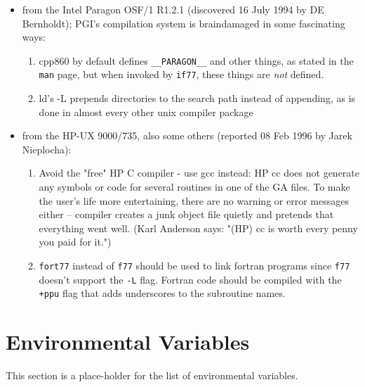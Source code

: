 \begin{itemize}
\item from the Intel Paragon OSF/1 R1.2.1 (discovered 16 July 1994 by DE Bernholdt);
PGI's compilation system is braindamaged in some fascinating ways:
\begin{enumerate}
\item cpp860 by default defines {\tt \_\_PARAGON\_\_} and other things, as stated in
   the {\tt man} page, but when invoked by {\tt if77}, these things are {\em not} defined.
\item ld's -L prepends directories to the search path instead of
   appending, as is done in almost every other unix compiler package
\end{enumerate}

\item from the HP-UX 9000/735, also some others (reported 08 Feb 1996 by Jarek Nieplocha):

\begin{enumerate}
\item Avoid the "free" HP C compiler - use gcc instead:
HP cc does not generate any symbols or code for several routines in one of
the GA files. To make the user's life more entertaining, there are no 
warning or error messages either -- compiler creates a junk object file
quietly and pretends that everything went well.
(Karl Anderson says: "(HP) cc is worth every penny you paid for it.")

\item {\tt fort77} instead of {\tt f77} should be used to link fortran programs since 
{\tt f77} doesn't support the {\tt -L} flag. Fortran code should be compiled with the 
{\tt +ppu} flag that adds underscores to the subroutine names.
\end{enumerate}

\end{itemize}

\section{Environmental Variables}
\label{sec:envar}

This section is a place-holder for the list of environmental variables.
